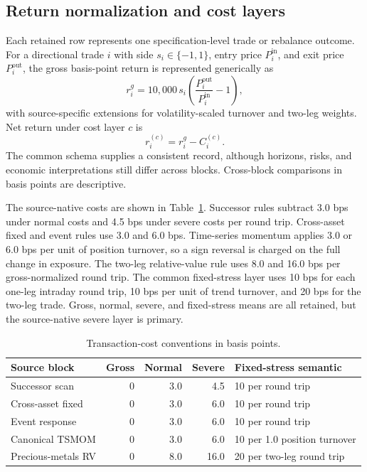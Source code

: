 \subsection{Return normalization and cost layers}\label{subsec:costs}

Each retained row represents one specification-level trade or rebalance outcome. For a directional trade $i$ with side $s_i\in\{-1,1\}$, entry price $P_i^{\mathrm{in}}$, and exit price $P_i^{\mathrm{out}}$, the gross basis-point return is represented generically as
\begin{equation}
 r^{g}_{i}=10{,}000\,s_i\left(\frac{P_i^{\mathrm{out}}}{P_i^{\mathrm{in}}}-1\right),
\end{equation}
with source-specific extensions for volatility-scaled turnover and two-leg weights. Net return under cost layer $c$ is
\begin{equation}
 r^{(c)}_{i}=r^{g}_{i}-C^{(c)}_{i}.
\end{equation}
The common schema supplies a consistent record, although horizons, risks, and economic interpretations still differ across blocks. Cross-block comparisons in basis points are descriptive.

The source-native costs are shown in Table~\ref{tab:costs}. Successor rules subtract 3.0 bps under normal costs and 4.5 bps under severe costs per round trip. Cross-asset fixed and event rules use 3.0 and 6.0 bps. Time-series momentum applies 3.0 or 6.0 bps per unit of position turnover, so a sign reversal is charged on the full change in exposure. The two-leg relative-value rule uses 8.0 and 16.0 bps per gross-normalized round trip. The common fixed-stress layer uses 10 bps for each one-leg intraday round trip, 10 bps per unit of trend turnover, and 20 bps for the two-leg trade. Gross, normal, severe, and fixed-stress means are all retained, but the source-native severe layer is primary.

\begin{table}[t]
\centering
\caption{Transaction-cost conventions in basis points.}\label{tab:costs}
\small
\begin{tabular}{lrrrp{4.1cm}}
\toprule
Source block & Gross & Normal & Severe & Fixed-stress semantic \\
\midrule
Successor scan & 0 & 3.0 & 4.5 & 10 per round trip \\
Cross-asset fixed & 0 & 3.0 & 6.0 & 10 per round trip \\
Event response & 0 & 3.0 & 6.0 & 10 per round trip \\
Canonical TSMOM & 0 & 3.0 & 6.0 & 10 per 1.0 position turnover \\
Precious-metals RV & 0 & 8.0 & 16.0 & 20 per two-leg round trip \\
\bottomrule
\end{tabular}
\end{table}

